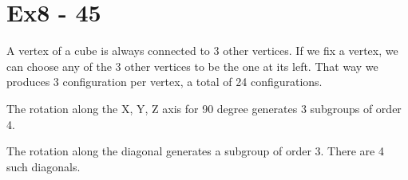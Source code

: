 \section*{Ex8 - 45}
A vertex of a cube is always connected to 3 other vertices. If we fix a vertex, we can choose any of the 3 other vertices to be the one at its left. That way we produces 3 configuration per vertex, a total of 24 configurations.

The rotation along the X, Y, Z axis for 90 degree generates 3 subgroups of order 4.

The rotation along the diagonal generates a subgroup of order 3. There are 4 such diagonals.